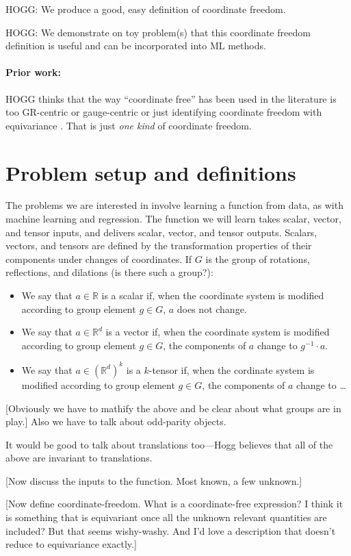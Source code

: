 \documentclass[12pt]{article}
\newcommand{\inv}{^{-1}}
\newcommand{\R}{{\mathbb R}}
\begin{document}
HOGG: We produce a good, easy definition of coordinate freedom.

HOGG: We demonstrate on toy problem(s) that this coordinate freedom definition is useful and can be incorporated into ML methods.

\paragraph{Prior work:}
HOGG thinks that the way ``coordinate free'' has been used in the literature is too GR-centric or gauge-centric or just identifying coordinate freedom with equivariance \cite{weiler}.
That is just \emph{one kind} of coordinate freedom.

\section{Problem setup and definitions}

The problems we are interested in involve learning a function from data, as with machine learning and regression.
The function we will learn takes scalar, vector, and tensor inputs, and delivers scalar, vector, and tensor outputs.
Scalars, vectors, and tensors are defined by the transformation properties of their components under changes of coordinates.
If $G$ is the group of rotations, reflections, and dilations (is there such a group?):
\begin{itemize}
  \item We say that $a\in\R$ is a scalar if, when the coordinate system is modified according to group element $g\in G$, $a$ does not change.
  \item We say that $a\in\R^d$ is a vector if, when the coordinate system is modified according to group element $g\in G$, the components of $a$ change to $g\inv\cdot a$.
  \item We say that $a\in(\R^d)^k$ is a $k$-tensor if, when the cordinate system is modified according to group element $g\in G$, the components of $a$ change to \ldots
\end{itemize}
[Obviously we have to mathify the above and be clear about what groups are in play.] Also we have to talk about odd-parity objects.

It would be good to talk about translations too---Hogg believes that all of the above are invariant to translations.

[Now discuss the inputs to the function. Most known, a few unknown.]

[Now define coordinate-freedom. What is a coordinate-free expression? I think it is something that is equivariant once all the unknown relevant quantities are included? But that seems wishy-washy. And I'd love a description that doesn't reduce to equivariance exactly.]
\end{document}
